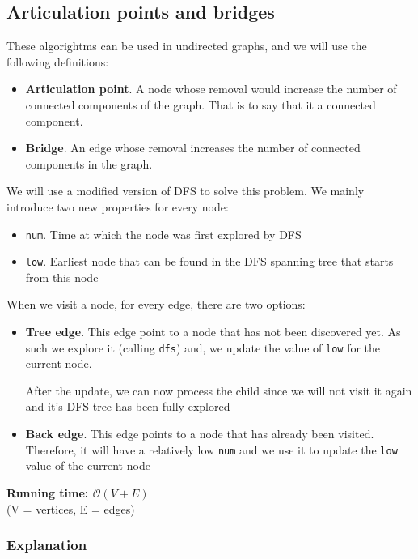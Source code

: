 \subsection{Articulation points and bridges}
These algorightms can be used in undirected graphs, and we
will use the following definitions:
\begin{itemize}
	\def\itemsep{0 pt}
	\item \textbf{Articulation point}. A node whose removal would increase the number
		of connected components of the graph. That  is to say
		that it  a connected component.
	\item \textbf{Bridge}. An edge whose removal increases the number of 
		connected components in the graph.
\end{itemize}
We will use a modified version of DFS to solve this problem. We mainly introduce two new
properties for every node:
\begin{itemize}
	\def\itemsep{0 pt}
	\item \texttt{num}. Time at which the node was first explored by DFS
	\item \texttt{low}. Earliest node that can be found in the DFS spanning 
		tree that starts from this node
\end{itemize}
When we visit a node, for every edge, there are two options:
\begin{itemize}
\def \itemsep{0pt}
	\item \textbf{Tree edge}. This edge point to a node that has not been 
		discovered yet. As such we explore it (calling \texttt{dfs})
		and, we update the value of \texttt{low} for the current
		node. 

		After the update, we can now process the child since we will
		not visit it again and it's DFS tree has been fully explored

	\item \textbf{Back edge}. This edge points to a node that has already
		been visited. Therefore, it will have a relatively low 
		\texttt{num} and we use it to update the \texttt{low}
		value of the current node
\end{itemize}
\newpage
{}
\noindent \textbf{\boldmath Running time: $\mathcal{O}(V+E)$}
\\ {\small (V = vertices, E = edges)}
\subsubsection*{Explanation}

